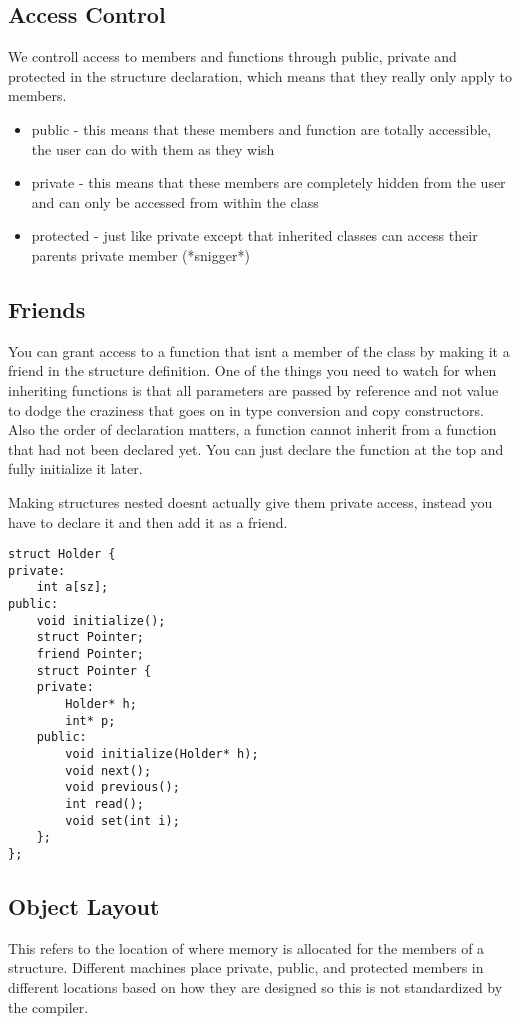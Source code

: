 \documentclass[12pt]{article}
\begin{document}
\subsection*{Access Control}
We controll access to members and functions through public, private and protected in the structure declaration, which means that they really only apply to members.
\begin{itemize}
\item public - this means that these members and function are totally accessible, the user can do with them as they wish
\item private - this means that these members are completely hidden from the user and can only be accessed from within the class
\item protected - just like private except that inherited classes can access their parents private member (*snigger*)
\end{itemize}

\subsection*{Friends}
You can grant access to a function that isnt a member of the class by making it a friend in the structure definition. One of the things you need to watch for when inheriting functions is that all parameters are passed by reference and not value to dodge the craziness that goes on in type conversion and copy constructors. Also the order of declaration matters, a function cannot inherit from a function that had not been declared yet. You can just declare the function at the top and fully initialize it later.

Making structures nested doesnt actually give them private access, instead you have to declare it and then add it as a friend.
\begin{lstlisting}
struct Holder {
private:
    int a[sz];
public:
    void initialize();
    struct Pointer;
    friend Pointer;
    struct Pointer {
    private:
        Holder* h;
        int* p;
    public:
        void initialize(Holder* h);
        void next();
        void previous();
        int read();
        void set(int i);
    };
};
\end{lstlisting}

\subsection*{Object Layout}
This refers to the location of where memory is allocated for the members of a structure. Different machines place private, public, and protected members in different locations based on how they are designed so this is not standardized by the compiler.
\end{document}
